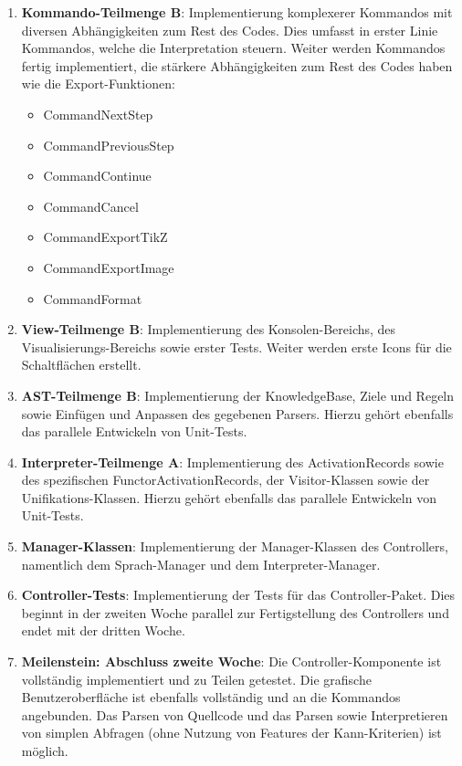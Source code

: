 \documentclass[parskip=full,11pt,twoside]{scrartcl}
\begin{document}
\begin{enumerate}
	\item \textbf{Kommando-Teilmenge B}: Implementierung komplexerer Kommandos mit diversen Abhängigkeiten zum Rest des Codes. Dies umfasst in erster Linie Kommandos, welche die Interpretation steuern. Weiter werden Kommandos fertig implementiert, die stärkere Abhängigkeiten zum Rest des Codes haben wie die Export-Funktionen:
	\begin{multicols}{3}
		\begin{itemize}
			\item CommandNextStep
			\item CommandPreviousStep
			\item CommandContinue
			\item CommandCancel
			
			\item CommandExportTikZ
			\item CommandExportImage
			\item CommandFormat
		\end{itemize}
	\end{multicols}

	\item \textbf{View-Teilmenge B}: Implementierung des Konsolen-Bereichs, des Visualisierungs-Bereichs sowie erster Tests. Weiter werden erste Icons für die Schaltflächen erstellt.

	\item \textbf{AST-Teilmenge B}: Implementierung der KnowledgeBase, Ziele und Regeln sowie Einfügen und Anpassen des gegebenen Parsers. Hierzu gehört ebenfalls das parallele Entwickeln von Unit-Tests.
	
	\item \textbf{Interpreter-Teilmenge A}: Implementierung des ActivationRecords sowie des spezifischen FunctorActivationRecords, der Visitor-Klassen sowie der Unifikations-Klassen. Hierzu gehört ebenfalls das parallele Entwickeln von Unit-Tests.
	
	\item \textbf{Manager-Klassen}: Implementierung der Manager-Klassen des Controllers, namentlich dem Sprach-Manager und dem Interpreter-Manager.
	
	\item \textbf{Controller-Tests}: Implementierung der Tests für das Controller-Paket. Dies beginnt in der zweiten Woche parallel zur Fertigstellung des Controllers und endet mit der dritten Woche.
	
	\item \textbf{Meilenstein: Abschluss zweite Woche}: Die Controller-Komponente ist vollständig implementiert und zu Teilen getestet. Die grafische Benutzeroberfläche ist ebenfalls vollständig und an die Kommandos angebunden. Das Parsen von Quellcode und das Parsen sowie Interpretieren von simplen Abfragen (ohne Nutzung von Features der Kann-Kriterien) ist möglich.
	

\end{enumerate}
\end{document}
